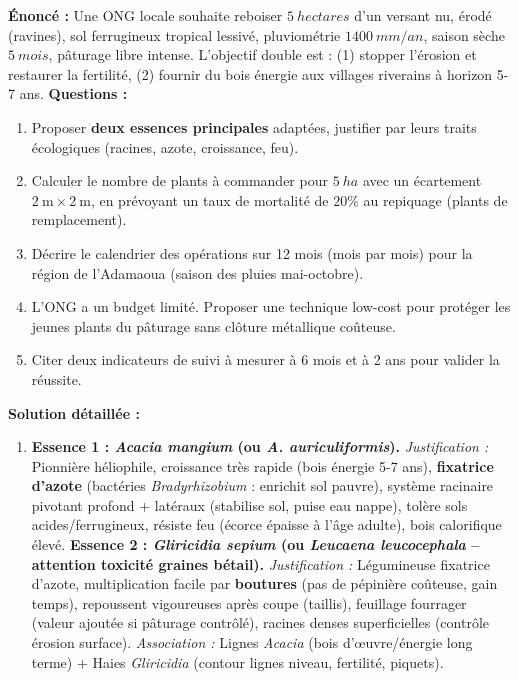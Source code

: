 \documentclass[11pt]{article}
\begin{document}
\begin{exoresolu}
    \textbf{Énoncé :} Une ONG locale souhaite reboiser $\SI{5}{hectares}$ d'un versant nu, érodé (ravines), sol ferrugineux tropical lessivé, pluviométrie $\SI{1400}{mm/an}$, saison sèche $\SI{5}{mois}$, pâturage libre intense. L'objectif double est : (1) stopper l'érosion et restaurer la fertilité, (2) fournir du bois énergie aux villages riverains à horizon 5-7 ans.
    \textbf{Questions :}
    \begin{enumerate}
        \item Proposer \textbf{deux essences principales} adaptées, justifier par leurs traits écologiques (racines, azote, croissance, feu).
        \item Calculer le nombre de plants à commander pour $\SI{5}{ha}$ avec un écartement $\SI{2}{\m}\times\SI{2}{\m}$, en prévoyant un taux de mortalité de $20\%$ au repiquage (plants de remplacement).
        \item Décrire le calendrier des opérations sur 12 mois (mois par mois) pour la région de l'Adamaoua (saison des pluies mai-octobre).
        \item L'ONG a un budget limité. Proposer une technique low-cost pour protéger les jeunes plants du pâturage sans clôture métallique coûteuse.
        \item Citer deux indicateurs de suivi à mesurer à 6 mois et à 2 ans pour valider la réussite.
    \end{enumerate}
    \tcblower
    \textbf{Solution détaillée :}
    \begin{enumerate}
        \item \textbf{Essence 1 : \emph{Acacia mangium} (ou \emph{A. auriculiformis}).}
              \textit{Justification :} Pionnière héliophile, croissance très rapide (bois énergie 5-7 ans), \textbf{fixatrice d'azote} (bactéries \emph{Bradyrhizobium} : enrichit sol pauvre), système racinaire pivotant profond + latéraux (stabilise sol, puise eau nappe), tolère sols acides/ferrugineux, résiste feu (écorce épaisse à l'âge adulte), bois calorifique élevé.
              \textbf{Essence 2 : \emph{Gliricidia sepium} (ou \emph{Leucaena leucocephala} -- attention toxicité graines bétail).}
              \textit{Justification :} Légumineuse fixatrice d'azote, multiplication facile par \textbf{boutures} (pas de pépinière coûteuse, gain temps), repoussent vigoureuses après coupe (taillis), feuillage fourrager (valeur ajoutée si pâturage contrôlé), racines denses superficielles (contrôle érosion surface). \textit{Association :} Lignes \emph{Acacia} (bois d'œuvre/énergie long terme) + Haies \emph{Gliricidia} (contour lignes niveau, fertilité, piquets).

\end{enumerate}
\end{exoresolu}
\end{document}
